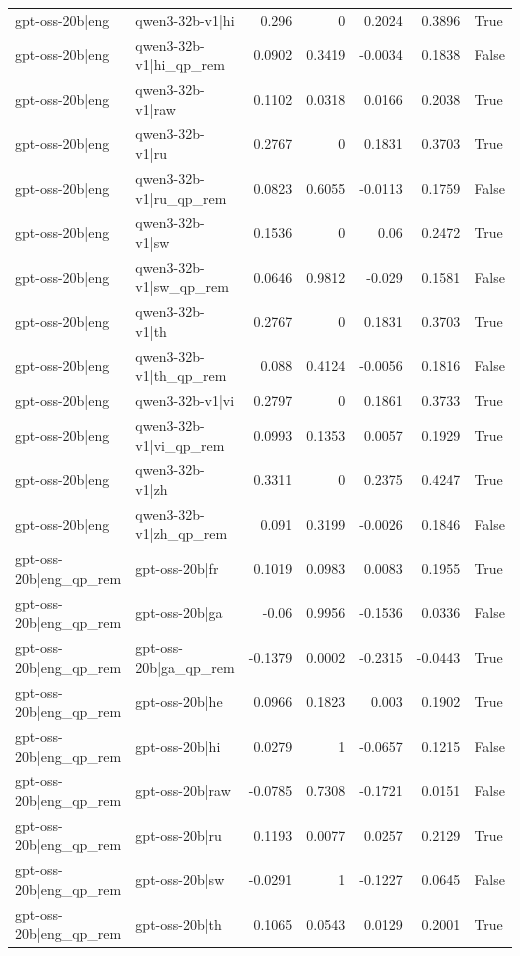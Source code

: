 \begin{table}
\begin{tabular}{l l r r r r l}
gpt-oss-20b|eng & qwen3-32b-v1|hi & 0.296 & 0 & 0.2024 & 0.3896 & True \\
gpt-oss-20b|eng & qwen3-32b-v1|hi_qp_rem & 0.0902 & 0.3419 & -0.0034 & 0.1838 & False \\
gpt-oss-20b|eng & qwen3-32b-v1|raw & 0.1102 & 0.0318 & 0.0166 & 0.2038 & True \\
gpt-oss-20b|eng & qwen3-32b-v1|ru & 0.2767 & 0 & 0.1831 & 0.3703 & True \\
gpt-oss-20b|eng & qwen3-32b-v1|ru_qp_rem & 0.0823 & 0.6055 & -0.0113 & 0.1759 & False \\
gpt-oss-20b|eng & qwen3-32b-v1|sw & 0.1536 & 0 & 0.06 & 0.2472 & True \\
gpt-oss-20b|eng & qwen3-32b-v1|sw_qp_rem & 0.0646 & 0.9812 & -0.029 & 0.1581 & False \\
gpt-oss-20b|eng & qwen3-32b-v1|th & 0.2767 & 0 & 0.1831 & 0.3703 & True \\
gpt-oss-20b|eng & qwen3-32b-v1|th_qp_rem & 0.088 & 0.4124 & -0.0056 & 0.1816 & False \\
gpt-oss-20b|eng & qwen3-32b-v1|vi & 0.2797 & 0 & 0.1861 & 0.3733 & True \\
gpt-oss-20b|eng & qwen3-32b-v1|vi_qp_rem & 0.0993 & 0.1353 & 0.0057 & 0.1929 & True \\
gpt-oss-20b|eng & qwen3-32b-v1|zh & 0.3311 & 0 & 0.2375 & 0.4247 & True \\
gpt-oss-20b|eng & qwen3-32b-v1|zh_qp_rem & 0.091 & 0.3199 & -0.0026 & 0.1846 & False \\
gpt-oss-20b|eng_qp_rem & gpt-oss-20b|fr & 0.1019 & 0.0983 & 0.0083 & 0.1955 & True \\
gpt-oss-20b|eng_qp_rem & gpt-oss-20b|ga & -0.06 & 0.9956 & -0.1536 & 0.0336 & False \\
gpt-oss-20b|eng_qp_rem & gpt-oss-20b|ga_qp_rem & -0.1379 & 0.0002 & -0.2315 & -0.0443 & True \\
gpt-oss-20b|eng_qp_rem & gpt-oss-20b|he & 0.0966 & 0.1823 & 0.003 & 0.1902 & True \\
gpt-oss-20b|eng_qp_rem & gpt-oss-20b|hi & 0.0279 & 1 & -0.0657 & 0.1215 & False \\
gpt-oss-20b|eng_qp_rem & gpt-oss-20b|raw & -0.0785 & 0.7308 & -0.1721 & 0.0151 & False \\
gpt-oss-20b|eng_qp_rem & gpt-oss-20b|ru & 0.1193 & 0.0077 & 0.0257 & 0.2129 & True \\
gpt-oss-20b|eng_qp_rem & gpt-oss-20b|sw & -0.0291 & 1 & -0.1227 & 0.0645 & False \\
gpt-oss-20b|eng_qp_rem & gpt-oss-20b|th & 0.1065 & 0.0543 & 0.0129 & 0.2001 & True \\

\end{tabular}
\end{table}
